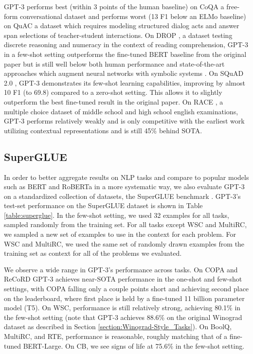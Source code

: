 GPT-3 performs best (within 3 points of the human baseline) on CoQA \cite{reddy2019coqa} a free-form conversational dataset and performs worst (13 F1 below an ELMo baseline) on QuAC \cite{choi2018quac} a dataset which requires modeling structured dialog acts and answer span selections of teacher-student interactions. On DROP \cite{dua2019drop}, a dataset testing discrete reasoning and numeracy in the context of reading comprehension, GPT-3 in a few-shot setting outperforms the fine-tuned BERT baseline from the original paper but is still well below both human performance and state-of-the-art approaches which augment neural networks with symbolic systems \cite{ran2019numnet}. On SQuAD 2.0 \cite{rajpurkar2018know}, GPT-3 demonstrates its few-shot learning capabilities, improving by almost 10 F1 (to 69.8) compared to a zero-shot setting. This allows it to slightly outperform the best fine-tuned result in the original paper. On RACE \cite{lai2017race}, a multiple choice dataset of middle school and high school english examinations, GPT-3 performs relatively weakly and is only competitive with the earliest work utilizing contextual representations and is still 45\% behind SOTA.

    \subsection{SuperGLUE}
    \label{section:SuperGLUE}

In order to better aggregate results on NLP tasks and compare to popular models such as BERT and RoBERTa in a more systematic way, we also evaluate GPT-3 on a standardized collection of datasets, the SuperGLUE benchmark \cite{wang2019superglue} \citep{wang2019superglue} \citep{clark2019boolq} \citep{demarneffe:cb} \citep{roemmele2011choice} \citep{khashabi2018looking} \citep{zhang2018record} \citep{dagan2006pascal} \citep{bar2006second} \citep{giampiccolo2007third} \citep{bentivogli2009fifth} \citep{pilehvar2018wic} \citep{poliak2018dnc}. GPT-3’s test-set performance on the SuperGLUE dataset is shown in Table \ref{table:superglue}.  In the few-shot setting, we used 32 examples for all tasks, sampled randomly from the training set. For all tasks except WSC and MultiRC, we sampled a new set of examples to use in the context for each problem. For WSC and MultiRC, we used the same set of randomly drawn examples from the training set as context for all of the problems we evaluated.

We observe a wide range in GPT-3’s performance across tasks.  On COPA and ReCoRD GPT-3 achieves near-SOTA performance in the one-shot and few-shot settings, with COPA falling only a couple points short and achieving second place on the leaderboard, where first place is held by a fine-tuned 11 billion parameter model (T5). On WSC, performance is still relatively strong, achieving 80.1\% in the few-shot setting (note that GPT-3 achieves 88.6\% on the original Winograd dataset as described in Section \ref{section:Winograd-Style_Tasks}).  On BoolQ, MultiRC, and RTE, performance is reasonable, roughly matching that of a fine-tuned BERT-Large. On CB, we see signs of life at 75.6\% in the few-shot setting.

